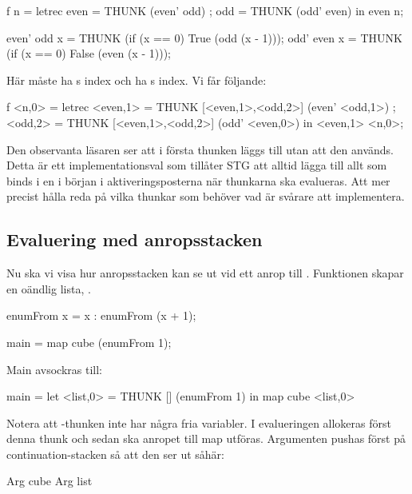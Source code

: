 \documentclass[../Core]{subfiles}
\begin{document}
\begin{codeEx}
f n = letrec 
    { even = THUNK (even' odd)
    ; odd  = THUNK (odd' even)
    } in even n;
    
even' odd x = THUNK (if (x == 0) True  (odd  (x - 1)));
odd' even x = THUNK (if (x == 0) False (even (x - 1)));
\end{codeEx}

Här måste  ha s index och  ha s index. Vi får följande:

\begin{codeEx}
f <n,0> = letrec 
    { <even,1> = THUNK [<even,1>,<odd,2>] (even' <odd,1>)
    ; <odd,2>  = THUNK [<even,1>,<odd,2>] (odd' <even,0>)
    } in <even,1> <n,0>;
\end{codeEx}

Den observanta läsaren ser att i första thunken läggs  till utan att den används. 
Detta är ett implementationsval som tillåter STG att alltid lägga till allt som 
binds i en  i början i aktiveringsposterna när thunkarna ska evalueras. 
Att mer precist hålla reda på vilka thunkar som behöver vad är svårare att implementera.




\subsection{Evaluering med anropsstacken}



Nu ska vi visa hur anropsstacken kan se ut vid ett anrop till .
Funktionen  skapar en oändlig lista, \ic{[x, x+1, x+2, ...]}.
 
\begin{codeEx}
enumFrom x = x : enumFrom (x + 1);

main = map cube (enumFrom 1);
\end{codeEx}

Main avsockras till:
\begin{codeEx}
main = let <list,0> = THUNK [] (enumFrom 1)
       in  map cube <list,0>
\end{codeEx}



Notera att -thunken inte har några fria variabler.
I evalueringen allokeras först denna thunk och sedan ska anropet till map
utföras. 
Argumenten pushas först på continuation-stacken så att den ser ut såhär:
\begin{codeEx}
Arg cube
Arg list
\end{codeEx}
\end{document}
